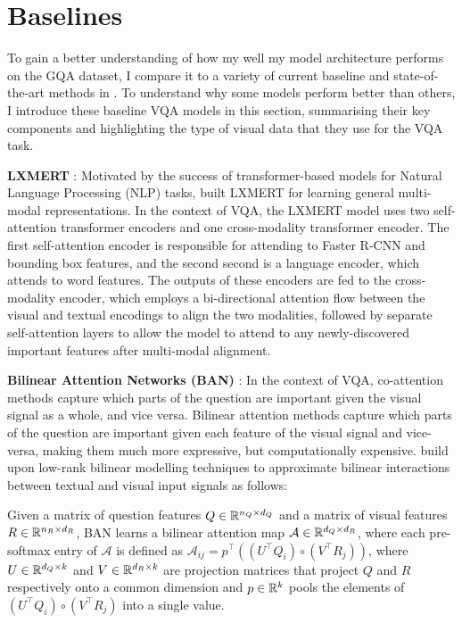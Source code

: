 \section{Baselines}

To gain a better understanding of how my well my model architecture performs on the GQA dataset, I compare it to a variety of current baseline and state-of-the-art methods in \chapterautorefname{ \ref{chapter:results}}. To understand why some models perform better than others, I introduce these baseline VQA models in this section, summarising their key components and highlighting the type of visual data that they use for the VQA task.

\textbf{LXMERT} \cite{tan2019lxmert}: Motivated by the success of transformer-based models \cite{vaswani2017attention} for Natural Language Processing (NLP) tasks, \citeauthor{tan2019lxmert} built LXMERT for learning general multi-modal representations. In the context of VQA, the LXMERT model uses two self-attention transformer encoders and one cross-modality transformer encoder. The first self-attention encoder is responsible for attending to Faster R-CNN \cite{ren2016faster} and bounding box features, and the second second is a language encoder, which attends to word features. The outputs of these encoders are fed to the cross-modality encoder, which employs a bi-directional attention flow between the visual and textual encodings to align the two modalities, followed by separate self-attention layers to allow the model to attend to any newly-discovered important features after multi-modal alignment.

\textbf{Bilinear Attention Networks (BAN)} \cite{kim2018bilinear}: In the context of VQA, co-attention methods capture which parts of the question are important given the visual signal as a whole, and vice versa. Bilinear attention methods capture which parts of the question are important given each feature of the visual signal and vice-versa, making them much more expressive, but computationally expensive. \citeauthor{kim2018bilinear} build upon low-rank bilinear modelling techniques \cite{wolf2007modeling, pirsiavash2009bilinear} to approximate bilinear interactions between textual and visual input signals as follows:

Given a matrix of question features \(Q \in \mathbb{R}^{n_Q \times d_Q}\) and a matrix of visual features \(R \in \mathbb{R}^{n_R \times d_R}\), BAN learns a bilinear attention map \(\mathcal{A} \in \mathbb{R}^{d_Q \times d_R}\), where each pre-softmax entry of \(\mathcal{A}\) is defined as \(\mathcal{A}_{ij} = p^\top((U^\top Q_i) \circ (V^\top R_j))\), where \(U \in \mathbb{R}^{d_Q \times k}\) and \(V \in \mathbb{R}^{d_R \times k}\) are projection matrices that project \(Q\) and \(R\) respectively onto a common dimension and \(p \in \mathbb{R}^{k}\) pools the elements of \((U^\top Q_i) \circ (V^\top R_j)\) into a single value.

